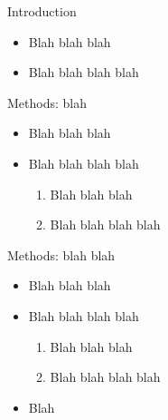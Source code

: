 \documentclass{beamer}
\begin{document}
\begin{frame}[t]
    \hspace{1cm}
    \begin{minipage}[t][.8\textheight]{0.45\textwidth}

        \begin{block}{Introduction}
            \begin{itemize}
                \item Blah blah blah
                \item Blah blah blah blah
            \end{itemize}
        \end{block}

        \vfill


        \begin{block}{Methods: blah}
            \begin{itemize}
                \item Blah blah blah
                \item Blah blah blah blah
                \begin{enumerate}
                    \normalsize
                    \item Blah blah blah
                    \item Blah blah blah blah
                \end{enumerate}
            \end{itemize}
        \end{block}

        \vfill

        \begin{block}{Methods: blah blah}
            \begin{itemize}
                \item Blah blah blah
                \item Blah blah blah blah
                \begin{enumerate}
                    \normalsize
                    \item Blah blah blah
                    \item Blah blah blah blah
                \end{enumerate}
                \item[\checkmark] Blah
            \end{itemize}
        \end{block}


\end{minipage}
\end{frame}
\end{document}
